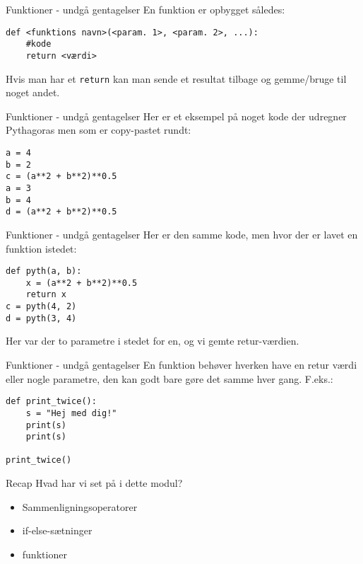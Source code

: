 \documentclass[main.tex]{subfiles}
\begin{document}
\begin{frame}[fragile]{Funktioner - undgå gentagelser}
En funktion er opbygget således:
\begin{lstlisting}[style=python]
def <funktions navn>(<param. 1>, <param. 2>, ...):
	#kode
	return <værdi>
\end{lstlisting}
Hvis man har et \texttt{return} kan man sende et resultat tilbage og gemme/bruge til noget andet.
\end{frame}


\begin{frame}[fragile]{Funktioner - undgå gentagelser}
	Her er et eksempel på noget kode der udregner Pythagoras men som er copy-pastet rundt:
	\begin{lstlisting}[style=python]
a = 4
b = 2
c = (a**2 + b**2)**0.5
a = 3
b = 4
d = (a**2 + b**2)**0.5
	\end{lstlisting}
\end{frame}

\begin{frame}[fragile]{Funktioner - undgå gentagelser}
	Her er den samme kode, men hvor der er lavet en funktion istedet:
	\begin{lstlisting}[style=python]
def pyth(a, b):
	x = (a**2 + b**2)**0.5
	return x
c = pyth(4, 2)
d = pyth(3, 4)
	\end{lstlisting}

	Her var der to parametre i stedet for en, og vi gemte retur-værdien.
\end{frame}


\begin{frame}[fragile]{Funktioner - undgå gentagelser}
	En funktion behøver hverken have en retur værdi eller nogle parametre, den kan godt bare gøre det samme hver gang. F.eks.:
	\begin{lstlisting}[style=python]
def print_twice():
	s = "Hej med dig!"
	print(s)
	print(s)
	
print_twice()
	\end{lstlisting}
\end{frame}


\begin{frame}[fragile]{Recap}
	Hvad har vi set på i dette modul?
	\pause
	\begin{itemize}
		\item Sammenligningsoperatorer
		\pause
		\item if-else-sætninger
		\pause
		\item funktioner
	\end{itemize}
\end{frame}
\end{document}
